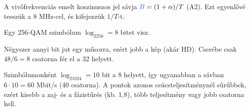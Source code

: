 A vivőfrekvenciás emelt koszinuszos jel sávja ${\ca{B}}=(1+\alpha)/T$ (A2). Ezt egyenlővé tesszük a 8 MHz-cel, és kifejezzük $1/T$-t.

\begin{center}\end{center}

Egy 256-QAM szimbólum $\log_2256=8$ bitet visz.

\begin{center}\end{center}

\begin{center}\end{center}

Négyszer annyi bit jut egy műsorra, ezért jobb a kép (akár HD). Cserébe csak $48/6=8$ csatorna fér el a 32 helyett.

Szimbólumonként $\log_21024=10$ bit a 8 helyett, így ugyanabban a sávban $6\cdot10=60$ Mbit/s (40 csatorna). A pontok azonos csúcsteljesítménynél sűrűbbek, ezért kisebb a zaj- és a fázistűrés (kb. 1,8\textdegree{}), több teljesítmény vagy jobb csatorna kell.

\begin{center}\end{center}
\begin{eredmeny}

\begin{center}\end{center}
\end{eredmeny}


